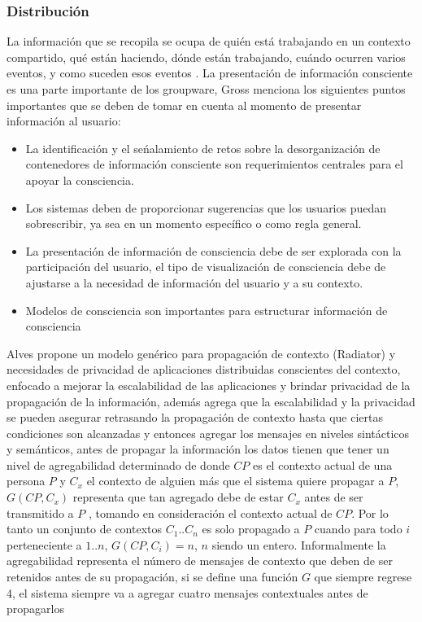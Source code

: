{\subsubsection{Distribuci\'on}
La informaci\'on que se recopila se ocupa de qui\'en est\'a trabajando en un contexto compartido, qu\'e est\'an haciendo, d\'onde est\'an trabajando, cu\'ando ocurren varios eventos, y como suceden esos eventos \cite{ardissono2012context}. La presentaci\'on de informaci\'on consciente es una parte importante de los groupware, Gross\cite{gross2013supporting} menciona los siguientes puntos importantes que se deben de tomar en cuenta al momento de presentar informaci\'on al usuario:
\begin{itemize}
\item La identificaci\'on y el se\'nalamiento de retos sobre la desorganizaci\'on de contenedores de informaci\'on consciente son requerimientos centrales para el apoyar la consciencia.
\item Los sistemas deben de proporcionar sugerencias que los usuarios puedan sobrescribir, ya sea en un momento espec\'ifico o como regla general.
\item La presentaci\'on de informaci\'on de consciencia debe de ser explorada con la participaci\'on del usuario, el tipo de visualizaci\'on de consciencia debe de ajustarse a la necesidad de informaci\'on del usuario y a su contexto.
\item Modelos de consciencia son importantes para estructurar informaci\'on de consciencia
\end{itemize}

Alves \cite{alves2013radiator} propone un modelo gen\'erico para propagaci\'on de contexto (Radiator) y necesidades de privacidad de aplicaciones distribuidas conscientes del contexto, enfocado a mejorar la escalabilidad de las aplicaciones y brindar privacidad de la propagaci\'on de la informaci\'on, adem\'as agrega que la escalabilidad y la privacidad se pueden asegurar retrasando la propagaci\'on de contexto hasta que ciertas condiciones son alcanzadas y entonces agregar los mensajes en niveles sint\'acticos y sem\'anticos, antes de propagar la informaci\'on los datos tienen que tener un nivel de agregabilidad determinado de donde  $CP$ es el contexto actual de una persona $P$ y $C_{x}$ el contexto de alguien m\'as que el sistema quiere propagar a $P$, $G( CP, C_{x} )$ representa que tan agregado debe de estar $C_{x}$ antes de ser transmitido a $P$ , tomando en consideraci\'on el contexto actual de $CP$. Por lo tanto un conjunto de contextos $C_{1}..C_{n}$ es solo propagado a $P$ cuando para todo $i$ perteneciente a $1..n$, $G( CP, C_{i} ) = n$, $n$ siendo un entero. Informalmente la agregabilidad representa el n\'umero de mensajes de contexto que deben de ser retenidos antes de su propagaci\'on, si se define una funci\'on $G$ que siempre regrese 4, el sistema siempre va a agregar cuatro mensajes contextuales antes de propagarlos

}
